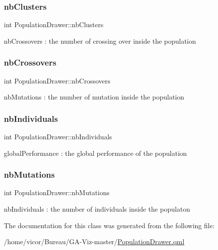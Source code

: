 \mbox{\label{class_population_drawer_ab4a61ab4b7eec14ea88057d1673ec424}} 
\subsubsection{\texorpdfstring{nb\+Clusters}{nbClusters}}
{\footnotesize\ttfamily int Population\+Drawer\+::nb\+Clusters}

nb\+Crossovers \+: the number of crossing over inside the population \mbox{\label{class_population_drawer_acb640608b088ecc9fe64fb31bc00f91e}} 
\subsubsection{\texorpdfstring{nb\+Crossovers}{nbCrossovers}}
{\footnotesize\ttfamily int Population\+Drawer\+::nb\+Crossovers}

nb\+Mutations \+: the number of mutation inside the population \mbox{\label{class_population_drawer_af20bdfe73e9bda7aba2257a101771071}} 
\subsubsection{\texorpdfstring{nb\+Individuals}{nbIndividuals}}
{\footnotesize\ttfamily int Population\+Drawer\+::nb\+Individuals}

global\+Performance \+: the global performance of the population \mbox{\label{class_population_drawer_ae31d2743689e0cca64420d05fa120bda}} 
\subsubsection{\texorpdfstring{nb\+Mutations}{nbMutations}}
{\footnotesize\ttfamily int Population\+Drawer\+::nb\+Mutations}

nb\+Individuals \+: the number of individuals inside the populaton 

The documentation for this class was generated from the following file\+:\begin{DoxyCompactItemize}
\item 
/home/vicor/\+Bureau/\+G\+A-\/\+Viz-\/master/\hyperlink{_population_drawer_8qml}{Population\+Drawer.\+qml}\end{DoxyCompactItemize}
